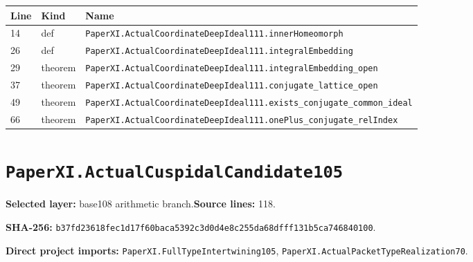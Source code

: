 \documentclass[10pt,oneside]{book}
\begin{document}
\begin{longtable}{@{}p{}p{}p{}@{}}\toprule Line&Kind&Name\\\midrule\endhead

14&def&\nolinkurl{PaperXI.ActualCoordinateDeepIdeal111.innerHomeomorph}\\

26&def&\nolinkurl{PaperXI.ActualCoordinateDeepIdeal111.integralEmbedding}\\

29&theorem&\nolinkurl{PaperXI.ActualCoordinateDeepIdeal111.integralEmbedding_open}\\

37&theorem&\nolinkurl{PaperXI.ActualCoordinateDeepIdeal111.conjugate_lattice_open}\\

49&theorem&\nolinkurl{PaperXI.ActualCoordinateDeepIdeal111.exists_conjugate_common_ideal}\\

66&theorem&\nolinkurl{PaperXI.ActualCoordinateDeepIdeal111.onePlus_conjugate_relIndex}\\

\bottomrule\end{longtable}

\section{\texorpdfstring{\nolinkurl{PaperXI.ActualCuspidalCandidate105}}{PaperXI.ActualCuspidalCandidate105}}\label{module:PaperXI.ActualCuspidalCandidate105}

\textbf{Selected layer:} base108 arithmetic branch.\quad\textbf{Source lines:} 118.\par\textbf{SHA-256:} {\scriptsize\nolinkurl{b37fd23618fec1d17f60baca5392c3d0d4e8c255da68dfff131b5ca746840100}}.


\textbf{Direct project imports:} \nolinkurl{PaperXI.FullTypeIntertwining105}, \nolinkurl{PaperXI.ActualPacketTypeRealization70}.
\end{document}
